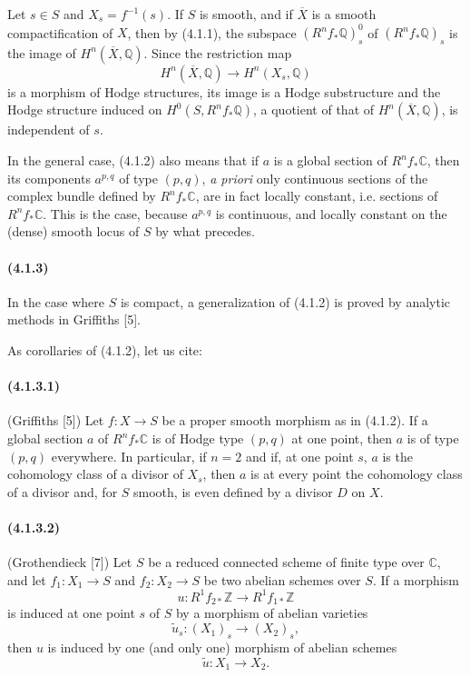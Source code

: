 \documentclass[10pt]{article}
\newcommand{\C}{\mathbb C}
\newcommand{\Q}{\mathbb Q}
\newcommand{\Z}{\mathbb Z}
\begin{document}
Let $s\in S$ and $X_s=f^{-1}(s)$. If $S$ is smooth, and if $\overline X$ is a smooth compactification of $X$, then by (4.1.1), the subspace $(R^nf_*\Q)^0_s$ of $(R^nf_*\Q)_s$ is the image of $H^n(\overline X,\Q)$. Since the restriction map
\[
H^n(\overline X,\Q)\longrightarrow H^n(X_s,\Q)
\]
is a morphism of Hodge structures, its image is a Hodge substructure and the Hodge structure induced on $H^0(S,R^nf_*\Q)$, a quotient of that of $H^n(\overline X,\Q)$, is independent of $s$.

In the general case, (4.1.2) also means that if $a$ is a global section of $R^nf_*\C$, then its components $a^{p,q}$ of type $(p,q)$, \emph{a priori} only continuous sections of the complex bundle defined by $R^nf_*\C$, are in fact locally constant, i.e. sections of $R^nf_*\C$. This is the case, because $a^{p,q}$ is continuous, and locally constant on the (dense) smooth locus of $S$ by what precedes.

\paragraph{(4.1.3)} In the case where $S$ is compact, a generalization of (4.1.2) is proved by analytic methods in Griffiths [5].

As corollaries of (4.1.2), let us cite:

\paragraph{(4.1.3.1)} (Griffiths [5]) Let $f:X\to S$ be a proper smooth morphism as in (4.1.2). If a global section $a$ of $R^nf_*\C$ is of Hodge type $(p,q)$ at one point, then $a$ is of type $(p,q)$ everywhere. In particular, if $n=2$ and if, at one point $s$, $a$ is the cohomology class
of a divisor of $X_s$, then $a$ is at every point the cohomology class of a divisor and, for $S$ smooth, is even defined by a divisor $D$ on $X$.

\paragraph{(4.1.3.2)} (Grothendieck [7]) Let $S$ be a reduced connected scheme of finite type over $\C$, and let $f_1:X_1\to S$ and $f_2:X_2\to S$ be two abelian schemes over $S$. If a morphism
\[
u:R^1f_{2*}\Z\longrightarrow R^1f_{1*}\Z
\]
is induced at one point $s$ of $S$ by a morphism of abelian varieties
\[
\widetilde u_s:(X_1)_s\longrightarrow (X_2)_s,
\]
then $u$ is induced by one (and only one) morphism of abelian schemes
\[
\widetilde u:X_1\longrightarrow X_2.
\]
\end{document}
